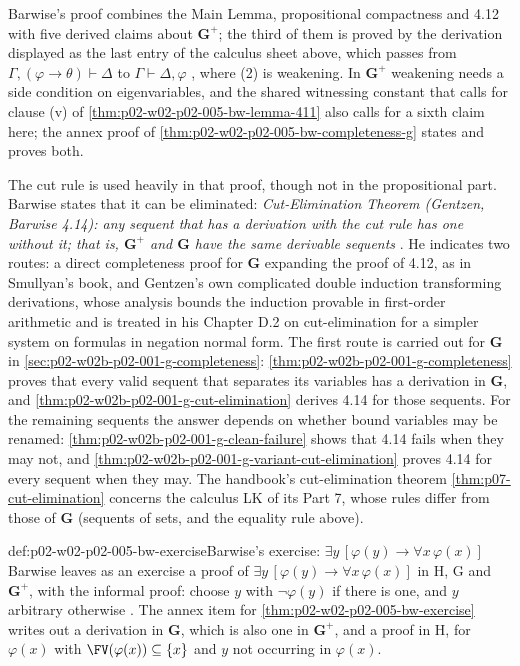 Barwise's proof combines the Main Lemma, propositional compactness and
4.12 with five derived claims about \(\mathbf G^{+}\); the third of them
is proved by the derivation displayed as the last entry of the calculus
sheet above, which passes from \(\Gamma,(\varphi\to\theta)\vdash\Delta\)
to \(\Gamma\vdash\Delta,\varphi\)
\cite[ch.~A.1, \S4, pp.~39--40]{Barwise1977FirstOrder}, where (2) is
weakening.  In \(\mathbf G^{+}\) weakening needs a side condition on
eigenvariables, and the shared witnessing constant that calls for clause
(v) of \cref{thm:p02-w02-p02-005-bw-lemma-411} also calls for a sixth
claim here; the annex proof of \cref{thm:p02-w02-p02-005-bw-completeness-g}
states and proves both.

The cut rule is used heavily in that proof, though not in the propositional
part.  Barwise states that it can be eliminated:
\emph{Cut-Elimination Theorem (Gentzen, Barwise 4.14): any sequent that has
a derivation with the cut rule has one without it; that is,
\(\mathbf G^{+}\) and \(\mathbf G\) have the same derivable sequents}
\cite[ch.~A.1, \S4, p.~40]{Barwise1977FirstOrder}.  He indicates two
routes: a direct completeness proof for \(\mathbf G\) expanding the proof
of 4.12, as in Smullyan's book, and Gentzen's own complicated double
induction transforming derivations, whose analysis bounds the induction
provable in first-order arithmetic and is treated in his Chapter D.2 on
cut-elimination for a simpler system on formulas in negation normal form.
The first route is carried out for \(\mathbf G\) in
\cref{sec:p02-w02b-p02-001-g-completeness}:
\cref{thm:p02-w02b-p02-001-g-completeness} proves that every valid sequent
that separates its variables has a derivation in \(\mathbf G\), and
\cref{thm:p02-w02b-p02-001-g-cut-elimination} derives 4.14 for those
sequents.  For the remaining sequents the answer depends on whether bound
variables may be renamed: \cref{thm:p02-w02b-p02-001-g-clean-failure} shows
that 4.14 fails when they may not, and
\cref{thm:p02-w02b-p02-001-g-variant-cut-elimination} proves 4.14 for every
sequent when they may.  The handbook's cut-elimination theorem
\cref{thm:p07-cut-elimination} concerns the calculus LK of its Part 7,
whose rules differ from those of \(\mathbf G\) (sequents of sets, and the
equality rule above).

\begin{hbexample}{def:p02-w02-p02-005-bw-exercise}{Barwise's exercise: \(\exists y\,[\varphi(y)\to\forall x\,\varphi(x)]\)}
Barwise leaves as an exercise a proof of
\(\exists y\,[\varphi(y)\to\forall x\,\varphi(x)]\) in H, G and
\(\mathbf G^{+}\), with the informal proof: choose \(y\) with
\(\neg\varphi(y)\) if there is one, and \(y\) arbitrary otherwise
\cite[ch.~A.1, \S4, p.~40]{Barwise1977FirstOrder}.  The annex item for
\cref{thm:p02-w02-p02-005-bw-exercise} writes out a derivation in
\(\mathbf G\), which is also one in \(\mathbf G^{+}\), and a proof in H, for
\(\varphi(x)\) with \(\FV(\varphi(x))\subseteq\{x\}\) and \(y\) not
occurring in \(\varphi(x)\).
\end{hbexample}

